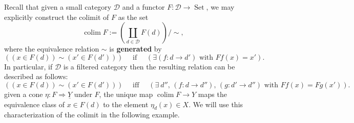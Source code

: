\documentclass{amsart}
\theoremstyle{plain}
\theoremstyle{definition}
\newcommand{\0}{\mathbf{0}}
\newcommand{\cD}{\mathcal D}
\renewcommand{\(}{\left(}
\renewcommand{\)}{\right)}
\def\on{\operatorname}
\def\Set{\on{Set}}
\DeclareMathOperator*{\colim}{colim}
\begin{document}
Recall that given a small category $\cD$ and a functor $F:\cD\to\Set$, we may explicitly construct the colimit of $F$ as the set
\[\colim F:=\(\coprod_{d\in \cD}F(d)\)/\sim,\]
where the equivalence relation $\sim$ is \textbf{generated} by
\[((x\in F(d))\sim(x'\in F(d')))\quad\text{ if }\quad(\exists(f:d\to d')\text{ with }Ff(x)=x').\]
In particular, if $\cD$ is a filtered category then the resulting relation can be described as follows:
\begin{equation}\label{eq1}
  ((x\in F(d))\sim(x'\in F(d')))\quad\text{ iff }\quad(\exists\ d'',\,(f:d\to d''),\,(g:d'\to d'')\text{ with }Ff(x)=Fg(x')).
\end{equation}
given a cone $\eta:F\Rightarrow\underline Y$ under $F$, the unique map $\colim F\to Y$ maps the equivalence class of $x\in F(d)$ to the element $\eta_d(x)\in X$. We will use this characterization of the colimit in the following example.
\end{document}
